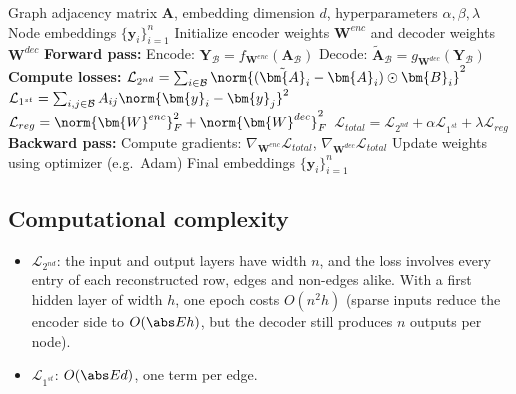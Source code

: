 \begin{notechapter}
\begin{algorithm}
\caption{Training a graph autoencoder (SDNE)}
\begin{algorithmic}[1]
\Require Graph adjacency matrix $\bm{A}$, embedding dimension $d$, hyperparameters $\alpha, \beta, \lambda$
\Ensure Node embeddings $\{\bm{y}_i\}_{i=1}^n$
\State Initialize encoder weights $\bm{W}^{enc}$ and decoder weights $\bm{W}^{dec}$
        \State \textbf{Forward pass:}
        \State \quad Encode: $\bm{Y}_{\mathcal{B}} = f_{\bm{W}^{enc}}(\bm{A}_{\mathcal{B}})$ 
        \State \quad Decode: $\tilde{\bm{A}}_{\mathcal{B}} = g_{\bm{W}^{dec}}(\bm{Y}_{\mathcal{B}})$ 
        \State
        \State \textbf{Compute losses:}
        \State \quad $\mathcal{L}_{2^{nd}} = \sum_{i \in \mathcal{B}} \norm{(\tilde{\bm{A}}_i - \bm{A}_i) \hadamard \bm{B}_i}^2$
        \State \quad $\mathcal{L}_{1^{st}} = \sum_{i,j \in \mathcal{B}} A_{ij} \norm{\bm{y}_i - \bm{y}_j}^2$
        \State \quad $\mathcal{L}_{reg} = \norm{\bm{W}^{enc}}^2_F + \norm{\bm{W}^{dec}}^2_F$
        \State \quad $\mathcal{L}_{total} = \mathcal{L}_{2^{nd}} + \alpha \mathcal{L}_{1^{st}} + \lambda \mathcal{L}_{reg}$
        \State
        \State \textbf{Backward pass:}
        \State \quad Compute gradients: $\nabla_{\bm{W}^{enc}} \mathcal{L}_{total}$, $\nabla_{\bm{W}^{dec}} \mathcal{L}_{total}$
        \State \quad Update weights using optimizer (e.g.\ Adam)
    \EndFor
\EndFor
\State \Return Final embeddings $\{\bm{y}_i\}_{i=1}^n$
\end{algorithmic}
\end{algorithm}

\subsection{Computational complexity}

\begin{itemize}
    \item \textbf{$\mathcal{L}_{2^{nd}}$}: the input and output layers have width $n$, and the loss involves every entry of each reconstructed row, edges and non-edges alike. With a first hidden layer of width $h$, one epoch costs $O(n^2h)$ (sparse inputs reduce the encoder side to $O(\abs Eh)$, but the decoder still produces $n$ outputs per node).
    \item \textbf{$\mathcal{L}_{1^{st}}$}: $O(\abs Ed)$, one term per edge.
\end{itemize}


\end{notechapter}
